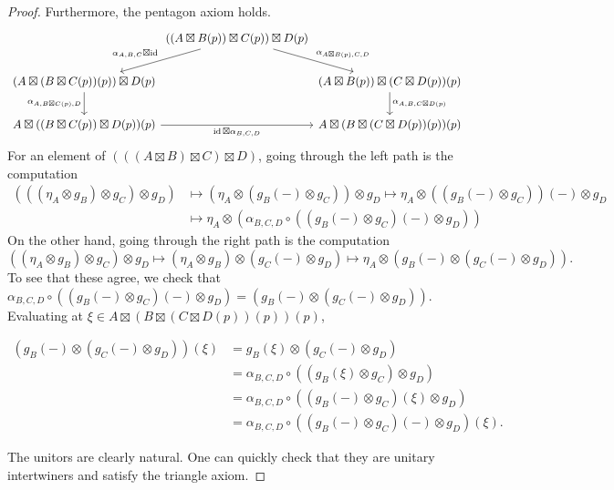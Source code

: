 \documentclass[11pt,reqno]{amsart}
\DeclareMathOperator{\id}{id}
\numberwithin{equation}{section}
\theoremstyle{plain}
\theoremstyle{definition}
\begin{document}
\begin{proof}
    Furthermore, the pentagon axiom holds.
\[\begin{tikzcd}[column sep=0, row sep=1em]
	& {((A \boxtimes B(p))\boxtimes C(p)) \boxtimes D(p)} & \\
	\\
	{(A \boxtimes (B \boxtimes C(p))(p)) \boxtimes D(p)} && {(A \boxtimes B(p)) \boxtimes (C \boxtimes D(p))(p)} \\
	\\
	{A \boxtimes ((B \boxtimes C(p)) \boxtimes D(p))(p)} && {A \boxtimes (B \boxtimes (C \boxtimes D(p))(p))(p)}
	\arrow["{\alpha_{A,B,C} \boxtimes \id}"', from=1-2, to=3-1]
	\arrow["{\alpha_{A \boxtimes B(p), C, D}}", from=1-2, to=3-3]
	\arrow["{\alpha_{A, B \boxtimes C(p), D}}"', from=3-1, to=5-1]
	\arrow["{\alpha_{A, B, C \boxtimes D(p)}}", from=3-3, to=5-3]
	\arrow["{\id \boxtimes \alpha_{B, C, D}}"', from=5-1, to=5-3]
\end{tikzcd}\]
    For an element of $(((A \boxtimes B)\boxtimes C) \boxtimes D)$, going through the left path is the computation
    \begin{align*}
    (((\eta_A \otimes g_B) \otimes g_C) \otimes g_D) &\mapsto (\eta_A \otimes (g_B(-)\otimes g_C)) \otimes g_D \mapsto \eta_A \otimes ((g_B(-) \otimes g_C))(-) \otimes g_D \\
    &\mapsto \eta_A \otimes (\alpha_{B, C, D} \circ ((g_B(-) \otimes g_C) (-) \otimes g_D))
    \end{align*}
    On the other hand, going through the right path is the computation 
    $$
    ((\eta_A \otimes g_B) \otimes g_C) \otimes g_D \mapsto (\eta_A \otimes g_B) \otimes (g_C(-) \otimes g_D) \mapsto \eta_A \otimes (g_B(-) \otimes (g_C(-) \otimes g_D)).
    $$
    To see that these agree, we check that $\alpha_{B, C, D} \circ ((g_B(-) \otimes g_C)(-) \otimes g_D) = (g_B(-) \otimes (g_C(-) \otimes g_D))$. 
    Evaluating at $\xi \in A \boxtimes (B \boxtimes (C \boxtimes D(p))(p))(p)$,

    \begin{align*}
    (g_B(-)\otimes (g_C(-) \otimes g_D))(\xi) 
    &= 
    g_B(\xi) \otimes (g_C(-) \otimes g_D) 
    \\&= 
    \alpha_{B, C, D} \circ ((g_B(\xi) \otimes g_C) \otimes g_D) 
    \\&= 
    \alpha_{B, C, D} \circ ((g_B(-) \otimes g_C)(\xi) \otimes g_D) 
    \\&= 
    \alpha_{B, C, D} \circ ((g_B(-) \otimes g_C)(-) \otimes g_D)(\xi).
    \end{align*} 
    
    The unitors are clearly natural. 
    One can quickly check that they are unitary intertwiners and satisfy the triangle axiom.
\end{proof}
\end{document}
